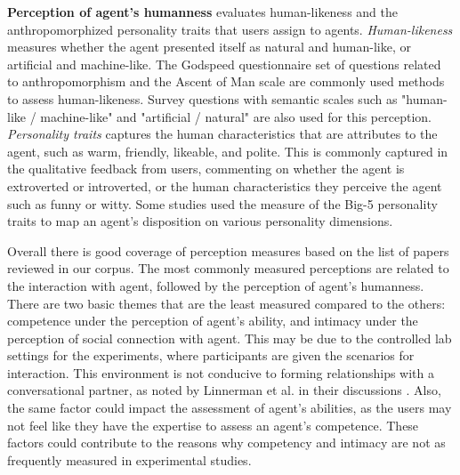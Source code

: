 \documentclass[sigconf,screen,review, anonymous]{acmart}
\newcommand{\cmt}[1]{}%
\begin{document}
\textbf{Perception of agent's humanness} evaluates human-likeness and the anthropomorphized personality traits that users assign to agents. \textit{Human-likeness} measures whether the agent presented itself as natural and human-like, or artificial and machine-like. The Godspeed questionnaire \cite{bartneck2009measurement}\cmt{godspeed} set of questions related to anthropomorphism and the Ascent of Man scale \cite{kteily2015ascent} are commonly used methods to assess human-likeness. Survey questions with semantic scales such as "human-like / machine-like" and "artificial / natural" are also used for this perception. \textit{Personality traits} captures the human characteristics that are attributes to the agent, such as warm, friendly, likeable, and polite. This is commonly captured in the qualitative feedback from users, commenting on whether the agent is extroverted or introverted, or the human characteristics they perceive the agent such as funny or witty. Some studies used the measure of the Big-5 personality traits \cite{gosling2003very} to map an agent's disposition on various personality dimensions.

Overall there is good coverage of perception measures based on the list of papers reviewed in our corpus. The most commonly measured perceptions are related to the interaction with agent, followed by the perception of agent's humanness. There are two basic themes that are the least measured compared to the others: competence under the perception of agent's ability, and intimacy under the perception of social connection with agent. This may be due to the controlled lab settings for the experiments, where participants are given the scenarios for interaction. This environment is not conducive to forming relationships with a conversational partner, as noted by Linnerman et al. in their discussions \cite{linnemann2018can}\cmt{[15]}. Also, the same factor could impact the assessment of agent's abilities, as the users may not feel like they have the expertise to assess an agent's competence. These factors could contribute to the reasons why competency and intimacy are not as frequently measured in experimental studies.

\end{document}
